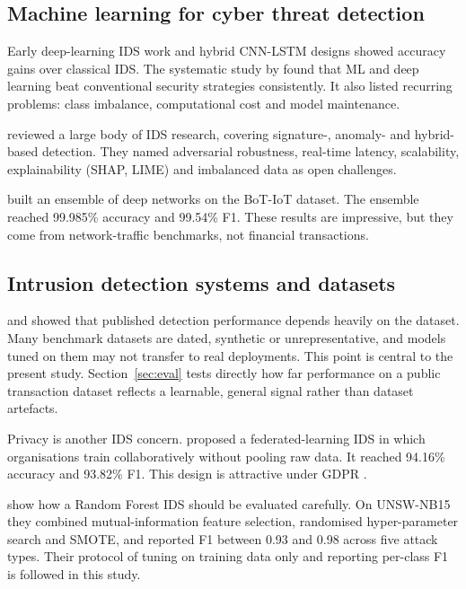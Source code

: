 \documentclass[12pt,a4paper]{article}
\begin{document}
\subsection{Machine learning for cyber threat detection}
Early deep-learning IDS work \citep{javaid2016deep, vinayakumar2019deep} and hybrid CNN-LSTM designs \citep{khan2019scalable} showed accuracy gains over classical IDS. The systematic study by \citet{ahmad2021network} found that ML and deep learning beat conventional security strategies consistently. It also listed recurring problems: class imbalance, computational cost and model maintenance.

\citet{hozouri2025comprehensive} reviewed a large body of IDS research, covering signature-, anomaly- and hybrid-based detection. They named adversarial robustness, real-time latency, scalability, explainability (SHAP, LIME) and imbalanced data as open challenges.

\citet{zhang2025intelligent} built an ensemble of deep networks on the BoT-IoT dataset. The ensemble reached 99.985\% accuracy and 99.54\% F1. These results are impressive, but they come from network-traffic benchmarks, not financial transactions.

\subsection{Intrusion detection systems and datasets}
\citet{ring2019survey} and \citet{ferrag2020deep} showed that published detection performance depends heavily on the dataset. Many benchmark datasets are dated, synthetic or unrepresentative, and models tuned on them may not transfer to real deployments. This point is central to the present study. Section~\ref{sec:eval} tests directly how far performance on a public transaction dataset reflects a learnable, general signal rather than dataset artefacts.

Privacy is another IDS concern. \citet{laddi2025federated} proposed a federated-learning IDS in which organisations train collaboratively without pooling raw data. It reached 94.16\% accuracy and 93.82\% F1. This design is attractive under GDPR \citep{gdpr2016}.

\citet{pospichal2026rf} show how a Random Forest IDS should be evaluated carefully. On UNSW-NB15 they combined mutual-information feature selection, randomised hyper-parameter search and SMOTE, and reported F1 between 0.93 and 0.98 across five attack types. Their protocol of tuning on training data only and reporting per-class F1 is followed in this study.
\end{document}
